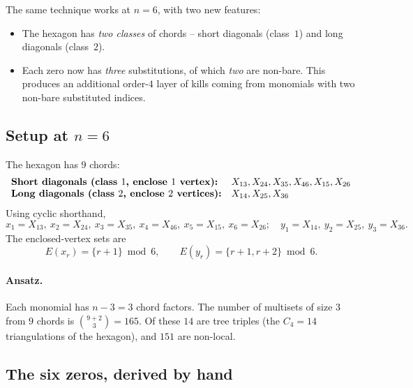 \documentclass[11pt]{article}
\begin{document}
The same technique works at $n = 6$, with two new features:
\begin{itemize}\setlength\itemsep{0pt}
  \item The hexagon has \emph{two classes} of chords -- short diagonals
  (class~$1$) and long diagonals (class~$2$).
  \item Each zero now has \emph{three} substitutions, of which
  \emph{two} are non-bare. This produces an additional order-$4$ layer
  of kills coming from monomials with two non-bare substituted indices.
\end{itemize}

\subsection{Setup at $n = 6$}

The hexagon has $9$ chords:
\[
\begin{array}{ll}
\text{\bf Short diagonals (class $1$, enclose $1$ vertex):} &
X_{13}, X_{24}, X_{35}, X_{46}, X_{15}, X_{26} \\
\text{\bf Long diagonals (class $2$, enclose $2$ vertices):} &
X_{14}, X_{25}, X_{36}
\end{array}
\]
Using cyclic shorthand,
\[
x_1 = X_{13},\ x_2 = X_{24},\ x_3 = X_{35},\ x_4 = X_{46},\ x_5 = X_{15},\ x_6 = X_{26};\quad
y_1 = X_{14},\ y_2 = X_{25},\ y_3 = X_{36}.
\]
The enclosed-vertex sets are
\[
E(x_r) = \{r+1\} \bmod 6, \qquad E(y_r) = \{r+1, r+2\} \bmod 6.
\]

\paragraph{Ansatz.} Each monomial has $n - 3 = 3$ chord factors. The
number of multisets of size $3$ from $9$ chords is $\binom{9+2}{3} = 165$.
Of these $14$ are tree triples (the $C_4 = 14$ triangulations of the
hexagon), and $151$ are non-local.

\subsection{The six zeros, derived by hand}
\end{document}
